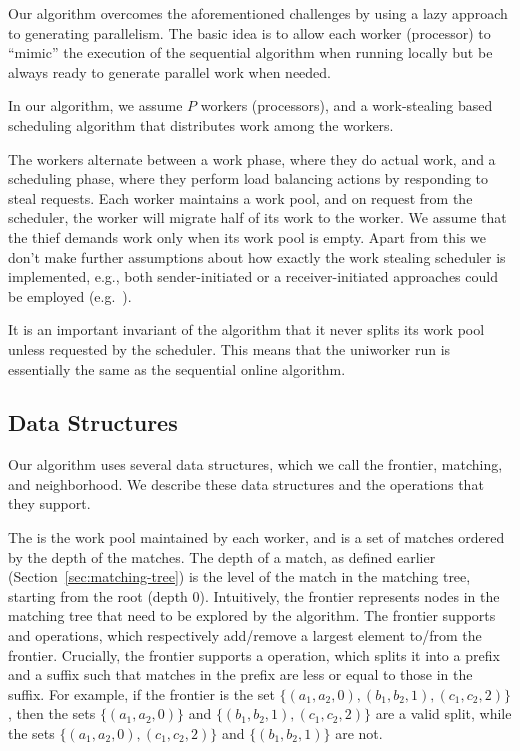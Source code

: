 Our algorithm overcomes the aforementioned challenges by using a lazy
approach to generating parallelism.  The basic idea is to allow each
worker (processor) to ``mimic'' the execution of the sequential
algorithm when running locally but be always ready to generate
parallel work when needed. 
%

In our algorithm, we assume $P$ workers (processors), and a
work-stealing based scheduling algorithm that distributes work among
the workers.


The workers alternate between a work phase, where they do actual work,
and a scheduling phase, where they perform load balancing actions by
responding to steal requests.
%
Each worker maintains a work pool, and on request from the scheduler,
the  worker will migrate half of its work to the
 worker.
%
We assume that the thief demands work only when its work pool is
empty.
%
Apart from this we don't make further assumptions about how
exactly the work stealing scheduler is implemented, e.g., both
sender-initiated or a receiver-initiated approaches could be
employed (e.g.~\cite{EagerLaZa86,MirchandaneyToSt89,Dandamudi97,Dinan+07,acarchra13}).
%

It is an important invariant of the algorithm that it never splits its
work pool unless requested by the scheduler.
%
This means that the uniworker run is essentially the same as the
sequential online algorithm.

\subsection{Data Structures}

Our algorithm uses several data structures, which we call the
frontier, matching, and neighborhood.
%
We describe these data structures and the operations that they
support.

The  is the work pool maintained by each worker, and is
a set of matches ordered by the depth of the matches.
%
The depth of a match, as defined earlier (Section~\ref{sec:matching-tree}) is the level of
the match in the matching tree, starting from the root (depth $0$).
%
Intuitively, the frontier represents nodes in the matching tree that
need to be explored by the algorithm.
%
The frontier supports  and  operations, which
respectively add/remove a largest element to/from the frontier.
%
Crucially, the frontier supports a  operation, which splits
it into a prefix and a suffix such that matches in the prefix are less
or equal to those in the suffix.
%
For example, if the frontier is the set $\{(a_1,a_2, 0), (b_1, b_2, 1), (c_1, c_2, 2)\}$,
then the sets $\{(a_1,a_2, 0)\}$ and
$\{(b_1, b_2, 1), (c_1, c_2, 2)\}$ are a valid split,
while the sets $\{(a_1,a_2, 0), (c_1, c_2, 2)\}$
and $\{(b_1, b_2, 1)\}$ are not.

